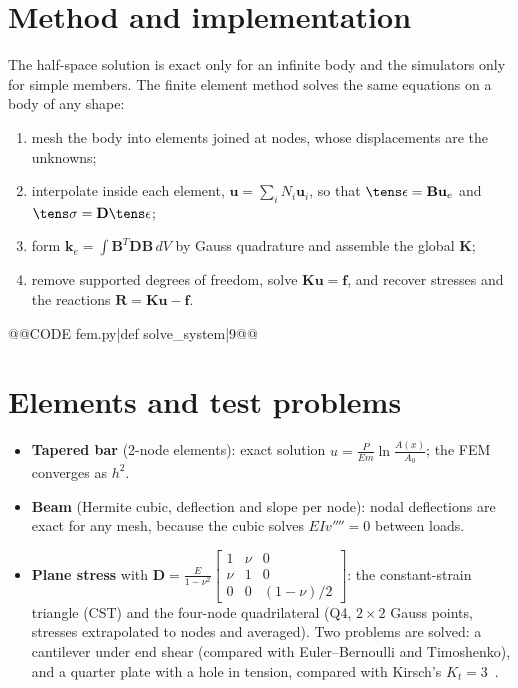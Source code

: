 \section{Method and implementation}
The half-space solution is exact only for an infinite body and the simulators only for simple members. The finite element method solves the same equations on a body of any shape:
\begin{enumerate}[nosep]
\item mesh the body into elements joined at nodes, whose displacements are the unknowns;
\item interpolate inside each element, $\mathbf u=\sum_iN_i\mathbf u_i$, so that $\tens\epsilon=\mathbf B\mathbf u_e$ and $\tens\sigma=\mathbf D\tens\epsilon$;
\item form $\mathbf k_e=\int\mathbf B^T\mathbf D\mathbf B\,dV$ by Gauss quadrature and assemble the global $\mathbf K$;
\item remove supported degrees of freedom, solve $\mathbf K\mathbf u=\mathbf f$, and recover stresses and the reactions $\mathbf R=\mathbf K\mathbf u-\mathbf f$.
\end{enumerate}
@@CODE fem.py|def solve_system|9@@

\section{Elements and test problems}
\begin{itemize}[leftmargin=*]
\item \textbf{Tapered bar} (2-node elements): exact solution $u=\frac{P}{Em}\ln\frac{A(x)}{A_0}$; the FEM converges as $h^2$.
\item \textbf{Beam} (Hermite cubic, deflection and slope per node): nodal deflections are exact for any mesh, because the cubic solves $EIv''''=0$ between loads.
\item \textbf{Plane stress} with $\mathbf D=\frac{E}{1-\nu^2}\left[\begin{smallmatrix}1&\nu&0\\\nu&1&0\\0&0&(1-\nu)/2\end{smallmatrix}\right]$: the constant-strain triangle (CST) and the four-node quadrilateral (Q4, $2\times2$ Gauss points, stresses extrapolated to nodes and averaged). Two problems are solved: a cantilever under end shear (compared with Euler--Bernoulli and Timoshenko), and a quarter plate with a hole in tension, compared with Kirsch's $K_t=3$~\cite{kirsch}.
\end{itemize}

